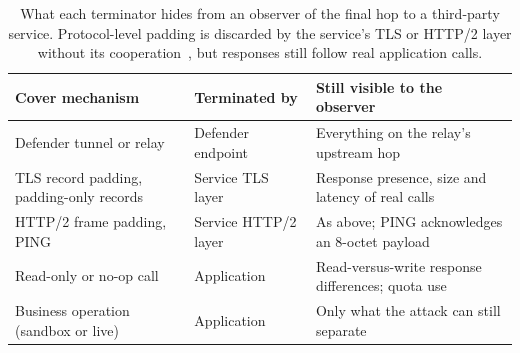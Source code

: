 \begin{table}[t]\centering\footnotesize
\caption{What each terminator hides from an observer of the final hop to a third-party service. Protocol-level padding is discarded by the service's TLS or HTTP/2 layer without its cooperation~\cite{rfc8446,rfc9113}, but responses still follow real application calls.}\label{tab:cover-necessity}
\setlength{\tabcolsep}{3pt}
\begin{tabularx}{\columnwidth}{@{}P{.3\columnwidth}P{.22\columnwidth}Y@{}}\toprule
Cover mechanism & Terminated by & Still visible to the observer \\\midrule
Defender tunnel or relay & Defender endpoint & Everything on the relay's upstream hop \\\addlinespace[2pt]
TLS record padding, padding-only records & Service TLS layer & Response presence, size and latency of real calls \\\addlinespace[2pt]
HTTP/2 frame padding, PING & Service HTTP/2 layer & As above; PING acknowledges an 8-octet payload \\\addlinespace[2pt]
Read-only or no-op call & Application & Read-versus-write response differences; quota use \\\addlinespace[2pt]
Business operation (sandbox or live) & Application & Only what the attack can still separate \\\bottomrule
\end{tabularx}\end{table}

